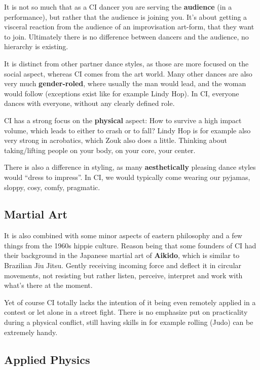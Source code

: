 It is not so much that as a CI dancer you are serving the \textbf{audience} (in a performance), but rather that the audience is joining you.
It's about getting a visceral reaction from the audience of an improvisation art-form, that they want to join.
Ultimately there is no difference between dancers and the audience, no hierarchy is existing.

It is distinct from other partner dance styles, as those are more focused on the social aspect, whereas CI comes from the art world.
Many other dances are also very much \textbf{gender-roled}, where usually the man would lead, and the woman would follow (exceptions exist like for example Lindy Hop).
In CI, everyone dances with everyone, without any clearly defined role.

CI has a strong focus on the \textbf{physical} aspect: How to survive a high impact volume, which leads to either to crash or to fall?
Lindy Hop is for example also very strong in acrobatics, which Zouk also does a little.
Thinking about taking/lifting people on your body, on your core, your center.

There is also a difference in styling, as many \textbf{aesthetically} pleasing dance styles would ``dress to impress''.
In CI, we would typically come wearing our pyjamas, sloppy, cosy, comfy, pragmatic.

\subsection{Martial Art}\label{subsec:martial-art}

It is also combined with some minor aspects of eastern philosophy and a few things from the 1960s hippie culture.
Reason being that some founders of CI had their background in the Japanese martial art of \textbf{Aikido}, which is similar to Brazilian Jiu Jitsu.
Gently receiving incoming force and deflect it in circular movements, not resisting but rather listen, perceive, interpret and work with what's there at the moment.

Yet of course CI totally lacks the intention of it being even remotely applied in a contest or let alone in a street fight.
There is no emphasize put on practicality during a physical conflict, still having skills in for example rolling (Judo) can be extremely handy.

\subsection{Applied Physics}\label{subsec:applied-physics}

